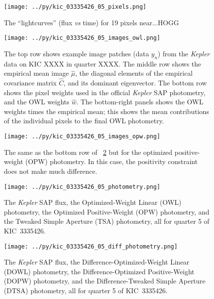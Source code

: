 \documentclass[12pt, letterpaper, preprint]{aastex}
\newcommand{\project}[1]{\textsl{#1}}
\newcommand{\foreign}[1]{\textsl{#1}}
\begin{document}
\clearpage
\begin{figure}
\texttt{[image: ../py/kic\_03335426\_05\_pixels.png]}
\caption{
The ``lightcurves'' (flux \foreign{vs} time) for 19 pixels near...HOGG
\label{fig:pixels}}
\end{figure}

\clearpage
\begin{figure}
\texttt{[image: ../py/kic\_03335426\_05\_images\_owl.png]}
\caption{
The top row shows example image patches (data $y_n$) from the \project{Kepler} data on KIC XXXX in quarter XXXX.
The middle row shows the empirical mean image $\hat{\mu}$,
  the diagonal elements of the empirical covariance matrix $\hat{C}$,
  and its dominant eigenvector.
The bottom row shows the pixel weights used in the official \project{Kepler} SAP photometry,
  and the OWL weights $\hat{w}$.
The bottom-right panels shows the OWL weights times the empirical mean;
  this shows the mean contributions of the individual pixels to the final OWL photometry.
\label{fig:images}}
\end{figure}

\clearpage
\begin{figure}
\texttt{[image: ../py/kic\_03335426\_05\_images\_opw.png]}
\caption{
The same as the bottom row of \figurename~\ref{fig:images}
  but for the optimized positive-weight (OPW) photometry.
In this case, the positivity constraint does not make much difference.
\label{fig:images_opw}}
\end{figure}

\clearpage
\begin{figure}
\texttt{[image: ../py/kic\_03335426\_05\_photometry.png]}
\caption{
The \project{Kepler} SAP flux,
  the Optimized-Weight Linear (OWL) photometry,
  the Optimized Positive-Weight (OPW) photometry,
  and the Tweaked Simple Aperture (TSA) photometry,
  all for quarter 5 of KIC~3335426.
\label{fig:results}}
\end{figure}

\clearpage
\begin{figure}
\texttt{[image: ../py/kic\_03335426\_05\_diff\_photometry.png]}
\caption{
The \project{Kepler} SAP flux,
  the Difference-Optimized-Weight Linear (DOWL) photometry,
  the Difference-Optimized Positive-Weight (DOPW) photometry,
  and the Difference-Tweaked Simple Aperture (DTSA) photometry,
  all for quarter 5 of KIC~3335426.
\label{fig:dresults}}
\end{figure}
\end{document}

